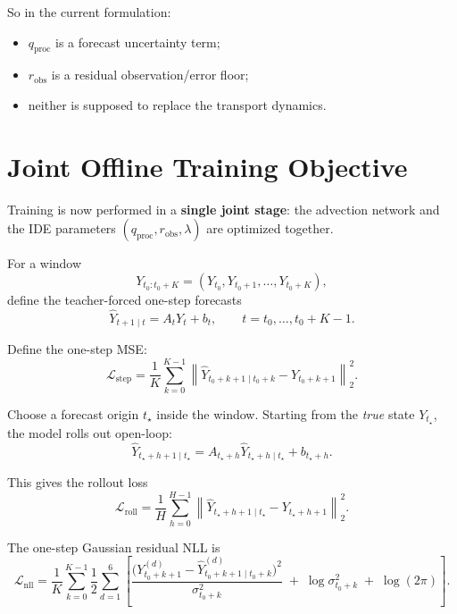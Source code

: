 \documentclass[11pt,a4paper]{article}
\begin{document}
So in the current formulation:
\begin{itemize}
  \item $q_{\mathrm{proc}}$ is a forecast uncertainty term;
  \item $r_{\mathrm{obs}}$ is a residual observation/error floor;
  \item neither is supposed to replace the transport dynamics.
\end{itemize}

\section{Joint Offline Training Objective}

Training is now performed in a \textbf{single joint stage}: the advection network and the IDE parameters $(q_{\mathrm{proc}}, r_{\mathrm{obs}}, \lambda)$ are optimized together.

For a window
\begin{equation}
Y_{t_0:t_0+K} = (Y_{t_0}, Y_{t_0+1}, \dots, Y_{t_0+K}),
\end{equation}
define the teacher-forced one-step forecasts
\begin{equation}
\widehat{Y}_{t+1 \mid t} = A_t Y_t + b_t,
\qquad
t=t_0,\dots,t_0+K-1.
\end{equation}

Define the one-step MSE:
\begin{equation}
\mathcal{L}_{\mathrm{step}}
=
\frac{1}{K}
\sum_{k=0}^{K-1}
\left\|
\widehat{Y}_{t_0+k+1 \mid t_0+k} - Y_{t_0+k+1}
\right\|_2^2.
\end{equation}

Choose a forecast origin $t_\star$ inside the window. Starting from the \emph{true} state $Y_{t_\star}$, the model rolls out open-loop:
\begin{equation}
\widehat{Y}_{t_\star+h+1 \mid t_\star}
=
A_{t_\star+h}\widehat{Y}_{t_\star+h \mid t_\star}+b_{t_\star+h}.
\end{equation}

This gives the rollout loss
\begin{equation}
\mathcal{L}_{\mathrm{roll}}
=
\frac{1}{H}
\sum_{h=0}^{H-1}
\left\|
\widehat{Y}_{t_\star+h+1 \mid t_\star} - Y_{t_\star+h+1}
\right\|_2^2.
\end{equation}

The one-step Gaussian residual NLL is
\begin{equation}
\mathcal{L}_{\mathrm{nll}}
=
\frac{1}{K}
\sum_{k=0}^{K-1}
\frac{1}{2}
\sum_{d=1}^{6}
\left[
\frac{\bigl(Y_{t_0+k+1}^{(d)}-\widehat{Y}_{t_0+k+1 \mid t_0+k}^{(d)}\bigr)^2}{\sigma_{t_0+k}^2}
\;+\;
\log \sigma_{t_0+k}^2
\;+\;
\log(2\pi)
\right].
\end{equation}
\end{document}
